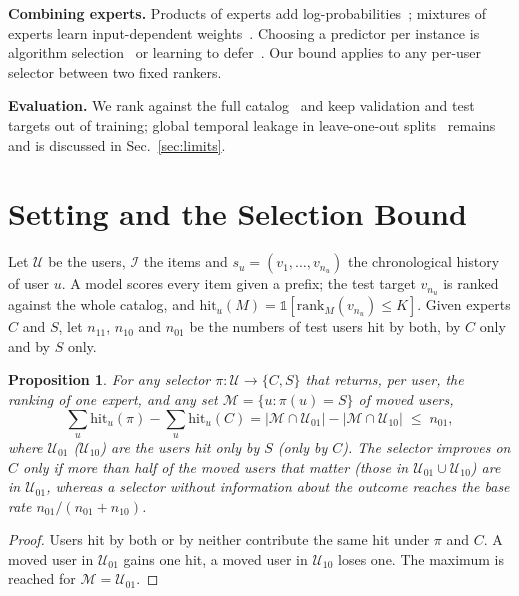 \documentclass[conference]{IEEEtran}
\newtheorem{proposition}{Proposition}
\begin{document}
\textbf{Combining experts.} Products of experts add log-probabilities~\cite{hinton2002poe}; mixtures of experts
learn input-dependent weights~\cite{shazeer2017moe,ma2018mmoe}. Choosing a predictor per instance is algorithm
selection~\cite{rice1976algorithm} or learning to defer~\cite{mozannar2020defer}. Our bound applies to any per-user
selector between two fixed rankers.

\textbf{Evaluation.} We rank against the full catalog~\cite{krichene2020sampled,dallmann2021sampling} and keep
validation and test targets out of training; global temporal leakage in leave-one-out
splits~\cite{ji2023leakage} remains and is discussed in Sec.~\ref{sec:limits}.

\section{Setting and the Selection Bound}\label{sec:bound}

Let $\mathcal{U}$ be the users, $\mathcal{I}$ the items and $s_u = (v_1,\dots,v_{n_u})$ the chronological history of
user $u$. A model scores every item given a prefix; the test target $v_{n_u}$ is ranked against the whole catalog,
and $\mathrm{hit}_u(M)=\mathbb{1}[\mathrm{rank}_M(v_{n_u})\le K]$.
Given experts $C$ and $S$, let $n_{11}$, $n_{10}$ and $n_{01}$ be the numbers of test users hit by both, by $C$ only
and by $S$ only.

\begin{proposition}\label{prop:bound}
For any selector $\pi:\mathcal{U}\to\{C,S\}$ that returns, per user, the ranking of one expert, and any set
$\mathcal{M}=\{u:\pi(u)=S\}$ of moved users,
\[
\textstyle\sum_u \mathrm{hit}_u(\pi)-\sum_u\mathrm{hit}_u(C)
= |\mathcal{M}\cap\mathcal{U}_{01}| - |\mathcal{M}\cap\mathcal{U}_{10}| \;\le\; n_{01},
\]
where $\mathcal{U}_{01}$ ($\mathcal{U}_{10}$) are the users hit only by $S$ (only by $C$). The selector improves on
$C$ only if more than half of the moved users that matter (those in $\mathcal{U}_{01}\cup\mathcal{U}_{10}$) are in
$\mathcal{U}_{01}$, whereas a selector without information about the outcome reaches the base rate
$n_{01}/(n_{01}+n_{10})$.
\end{proposition}
\begin{proof}
Users hit by both or by neither contribute the same hit under $\pi$ and $C$. A moved user in $\mathcal{U}_{01}$ gains
one hit, a moved user in $\mathcal{U}_{10}$ loses one. The maximum is reached for $\mathcal{M}=\mathcal{U}_{01}$.
\end{proof}
\end{document}
